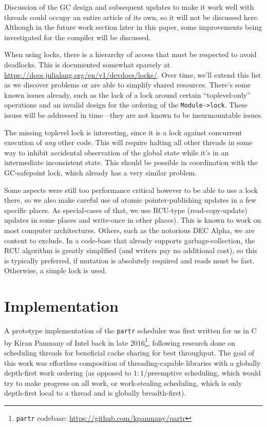 \documentclass{juliacon}
\begin{document}
Discussion of the GC design and subsequent updates to make it work well with threads could occupy an entire article of its own, so it will not be discussed here. Although in the future work section later in this paper, some improvements being investigated for the compiler will be discussed.

When using locks, there is a hierarchy of access that must be respected to avoid deadlocks. This is documented somewhat sparsely at \url{https://docs.julialang.org/en/v1/devdocs/locks/}. Over time, we'll extend this list as we discover problems or are able to simplify shared resources. There's some known issues already, such as the lack of a lock around certain ``toplevel-only'' operations and an invalid design for the ordering of the \verb|Module->lock|. These issues will be addressed in time—they are not known to be insurmountable issues.

The missing toplevel lock is interesting, since it is a lock against concurrent execution of \textit{any} other code. This will require halting all other threads in some way to inhibit accidental observation of the global state while it's in an intermediate inconsistent state. This should be possible in coordination with the GC-safepoint lock, which already has a very similar problem.

Some aspects were still too performance critical however to be able to use a lock there, so we also make careful use of atomic pointer-publishing updates in a few specific places. As special-cases of that, we use RCU-type (read-copy-update) updates in some places and write-once in other places). This is known to work on most computer architectures. Others, such as the notorious DEC Alpha, we are content to exclude. In a code-base that already supports garbage-collection, the RCU algorithm is greatly simplified (and writers pay no additional cost), so this is typically preferred, if mutation is absolutely required and reads must be fast. Otherwise, a simple lock is used.

\section{Implementation}
\label{subsub:implementation}

A prototype implementation of the \verb|partr| scheduler was first written for us in C by Kiran Pamnany of Intel back in late 2016\footnote{\verb|partr| codebase: \url{https://github.com/kpamnany/partr}}, following research done on scheduling threads for beneficial cache sharing for best throughput\cite{Chen:2007:STC:1248377.1248396}. The goal of this work was effortless composition of threading-capable libraries with a globally depth-first work ordering (as opposed to $1 \mathbin{:} 1$/preemptive scheduling, which would try to make progress on all work, or work-stealing scheduling, which is only depth-first local to a thread and is globally breadth-first).
\end{document}
